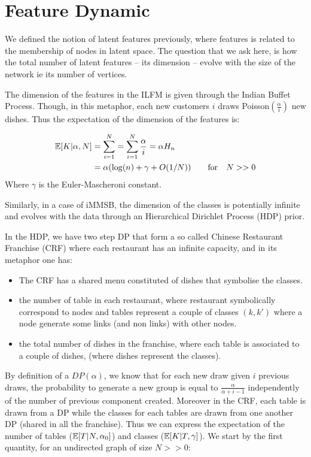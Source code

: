 \section{Feature Dynamic}
\label{sec:dynamic}

We defined the notion of latent features previously, where features is related to the membership of nodes in latent space.  The question that we ask here, is how the total number of latent features -- its dimension -- evolve with the size of the network ie its number of vertices.


The dimension of the features in the ILFM is given through the Indian Buffet Process. Though, in this metaphor, each new customers $i$ draws Poisson$(\frac{\alpha}{i})$ new dishes. Thus the expectation of the dimension of the features is:

\begin{align*}
\mathbb{E}[K|\alpha, N] &= \sum_{i=1}^{N} = \sum_{i=1}^N \frac{\alpha}{i} = \alpha H_n \\
&= \alpha(\log(n) + \gamma +O(1/N) ) \qquad  \textnormal{for} \quad N >> 0
\end{align*}
Where $\gamma$ is the Euler-Mascheroni constant.

Similarly, in a case of iMMSB, the dimension of the classes is potentially infinite and evolves with the data through an Hierarchical Dirichlet Process (HDP) prior.

In the HDP, we have two step DP that form a so called Chinese Restaurant Franchise (CRF) where each restaurant has an infinite capacity, and in its metaphor one has:
\begin{itemize}
\item The CRF has a shared menu constituted of dishes that symbolise the classes.
\item the number of table in each restaurant, where restaurant symbolically correspond to nodes and tables represent a couple of classes $(k,k')$ where a node generate some links (and non links) with other nodes. 
\item the total number of dishes in the franchise, where each table is associated to a couple of dishes, (where dishes represent the classes).
\end{itemize}

By definition of a \(DP(\alpha)\), we know that for each new draw given
\(i\) previous draws, the probability to generate a new group is equal
to \(\frac{\alpha}{\alpha +i-1}\) independently of the number of previous
component created. Moreover in the CRF, each table is drawn from a DP while the classes for each tables are drawn from one another DP (shared in all the franchise). Thus we can express the expectation of the number of tables ($\mathbb{E}[T|N, \alpha_0]$) and classes ($\mathbb{E}[K|T, \gamma]$). We start by the first quantity, for an undirected graph of size $N >> 0$:

